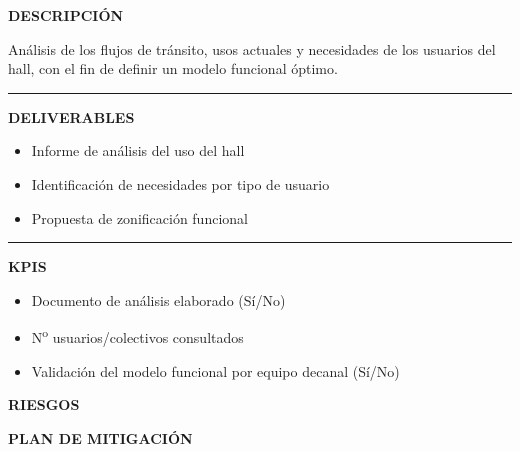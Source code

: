 \documentclass[11pt,a4paper]{scrreprt}
\newcommand{\fieldlabel}[1]{%
  {\footnotesize\sffamily\bfseries\color{mutedcolor}\MakeUppercase{#1}}\par\nopagebreak[4]
}
\newcommand{\fieldsep}{\vspace{3pt}\noindent\textcolor{bordercolor}{\rule{\linewidth}{0.4pt}}\vspace{3pt}\par}
\begin{document}
\begin{tcolorbox}[pabox={espcolor}{PA1.1 \enspace\textbullet\enspace Análisis de uso del espacio del hall}]

\fieldlabel{Descripci\'on}
{\small Análisis de los flujos de tránsito, usos actuales y necesidades de los usuarios del hall, con el fin de definir un modelo funcional óptimo.}\par
\fieldsep
\fieldlabel{Deliverables}
{\small \begin{itemize}[noitemsep,topsep=2pt]
\item Informe de análisis del uso del hall
\item Identificación de necesidades por tipo de usuario
\item Propuesta de zonificación funcional
\end{itemize}}\par
\fieldsep
\fieldlabel{KPIs}
{\small \begin{itemize}[noitemsep,topsep=2pt]
\item Documento de análisis elaborado (Sí/No)
\item N\textsuperscript{o} usuarios/colectivos consultados
\item Validación del modelo funcional por equipo decanal (Sí/No)
\end{itemize}}\par
\end{tcolorbox}
\begin{tcolorbox}[riskbox]
{\footnotesize\sffamily\bfseries\color{red!50!black} RIESGOS}\par{}
\end{tcolorbox}
\begin{tcolorbox}[mitbox]
{\footnotesize\sffamily\bfseries\color{green!40!black} PLAN DE MITIGACI\'ON}\par{}
\end{tcolorbox}
\vspace{8pt}
\end{document}
